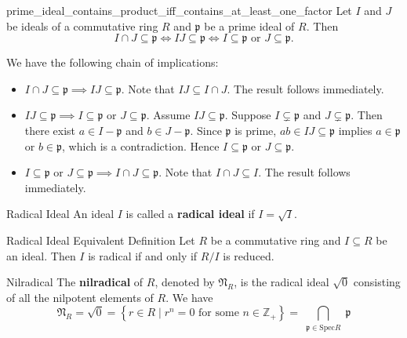 \begin{proposition}{}{prime_ideal_contains_product_iff_contains_at_least_one_factor}
    Let $I$ and $J$ be ideals of a commutative ring $R$ and $\mathfrak{p}$ be a prime ideal of $R$. Then 
    \[
        I\cap J\subseteq \mathfrak{p}\iff IJ\subseteq \mathfrak{p}\iff I\subseteq \mathfrak{p}\text{ or }J\subseteq \mathfrak{p}.
    \]
\end{proposition}

\begin{prf}
    We have the following chain of implications:
    \begin{itemize}
        \item $I\cap J\subseteq \mathfrak{p}\implies IJ\subseteq \mathfrak{p}$. Note that $IJ\subseteq I\cap J$. The result follows immediately.
        \item $IJ\subseteq \mathfrak{p}\implies I\subseteq \mathfrak{p}\text{ or }J\subseteq \mathfrak{p}$. Assume $IJ\subseteq \mathfrak{p}$. Suppose $I\subsetneq \mathfrak{p}$ and $J\subsetneq \mathfrak{p}$. Then there exist $a\in I-\mathfrak{p}$ and $b\in J-\mathfrak{p}$. Since $\mathfrak{p}$ is prime, $ab\in IJ\subseteq \mathfrak{p}$ implies $a\in \mathfrak{p}$ or $b\in \mathfrak{p}$, which is a contradiction. Hence $I\subseteq \mathfrak{p}$ or $J\subseteq \mathfrak{p}$.
        \item $I\subseteq \mathfrak{p}\text{ or }J\subseteq \mathfrak{p}\implies I\cap J\subseteq \mathfrak{p}$. Note that $I\cap J\subseteq I$. The result follows immediately.
    \end{itemize}
\end{prf}


\begin{definition}{Radical Ideal}{}
    An ideal $I$ is called a \textbf{radical ideal} if $I=\sqrt{I}$.
\end{definition}

\begin{proposition}{Radical Ideal Equivalent Definition}{}
    Let $R$ be a commutative ring and $I\subseteq R$ be an ideal. Then $I$ is radical if and only if $R/I$ is reduced.
\end{proposition}

\begin{definition}{Nilradical}{}
    The \textbf{nilradical} of $R$, denoted by $\mathfrak{N}_R$, is the radical ideal $\sqrt{0}$ consisting of all the nilpotent elements of $R$. We have
    \[
        \mathfrak{N}_R=\sqrt{0}=\left\{ r \in R \mid r^n=0 \text{ for some } n \in \mathbb{Z}_{+} \right\} = \bigcap_{\substack{\mathfrak{p} \in \mathrm{Spec} R }} \mathfrak{p}
            \]
\end{definition}



